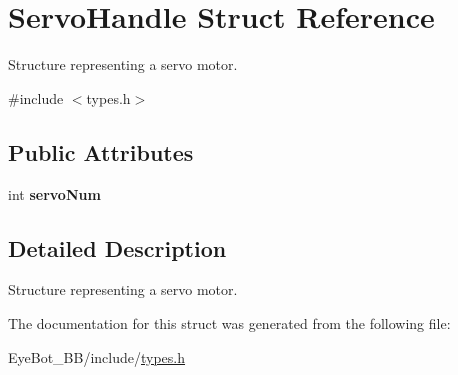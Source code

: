 \hypertarget{struct_servo_handle}{\section{\-Servo\-Handle \-Struct \-Reference}
\label{struct_servo_handle}
}


\-Structure representing a servo motor.  




{\ttfamily \#include $<$types.\-h$>$}

\subsection*{\-Public \-Attributes}
\begin{DoxyCompactItemize}
\item 
\hypertarget{struct_servo_handle_a5384d7758686ace8b43794bd9a3d3172}{int {\bfseries servo\-Num}}\label{struct_servo_handle_a5384d7758686ace8b43794bd9a3d3172}

\end{DoxyCompactItemize}


\subsection{\-Detailed \-Description}
\-Structure representing a servo motor. 

\-The documentation for this struct was generated from the following file\-:\begin{DoxyCompactItemize}
\item 
\-Eye\-Bot\-\_\-\-B\-B/include/\hyperlink{types_8h}{types.\-h}\end{DoxyCompactItemize}
